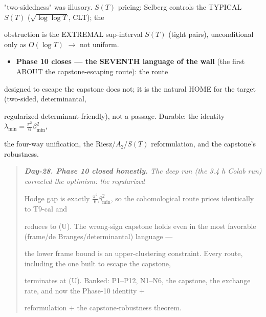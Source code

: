 \documentclass[10pt]{article}
\begin{document}
  "two-sidedness" was illusory. $S(T)$ pricing: Selberg controls the TYPICAL $S(T)$ ($\sqrt{\log\log T}$, CLT); the\par
  obstruction is the EXTREMAL sup-interval $S(T)$ (tight pairs), unconditional only as $O(\log T)$ \ensuremath{\to} not uniform.\par
\begin{itemize}
\item \textbf{Phase 10 closes --- the SEVENTH language of the wall} (the first ABOUT the capstone-escaping route): the route
\end{itemize}
  designed to escape the capstone does not; it is the natural HOME for the target (two-sided, determinantal,\par
  regularized-determinant-friendly), not a passage. Durable: the identity $\lambda_{\min}{=}\frac{\pi^2}{6}\beta_{\min}^2$,\par
  the four-way unification, the Riesz/$A_2$/$S(T)$ reformulation, and the capstone's robustness.\par

\begin{quote}\itshape
\textbf{Day-28. Phase 10 closed honestly.} The deep run (the 3.4 h Colab run) corrected the optimism: the regularized\par
Hodge gap is exactly $\frac{\pi^2}{6}\beta_{\min}^2$, so the cohomological route prices identically to T9-cal and\par
reduces to (U). The wrong-sign capstone holds even in the most favorable (frame/de Branges/determinantal) language ---\par
the lower frame bound is an upper-clustering constraint. Every route, including the one built to escape the capstone,\par
terminates at (U). Banked: P1--P12, N1--N6, the capstone, the exchange rate, and now the Phase-10 identity +\par
reformulation + the capstone-robustness theorem.\par
\end{quote}
\end{document}
